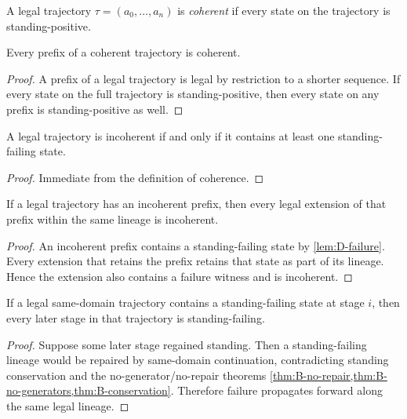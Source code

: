 \begin{definition}
A legal trajectory $\tau=(a_0,\dots,a_n)$ is \emph{coherent} if every state on the trajectory is standing-positive.
\end{definition}

\begin{lemma}
\label{thm:D-prefix}
Every prefix of a coherent trajectory is coherent.
\end{lemma}

\begin{proof}
A prefix of a legal trajectory is legal by restriction to a shorter sequence. If every state on the full trajectory is standing-positive, then every state on any prefix is standing-positive as well.
\end{proof}

\begin{lemma}
\label{lem:D-failure}
A legal trajectory is incoherent if and only if it contains at least one standing-failing state.
\end{lemma}

\begin{proof}
Immediate from the definition of coherence.
\end{proof}

\begin{theorem}
\label{thm:D-no-deferred}
If a legal trajectory has an incoherent prefix, then every legal extension of that prefix within the same lineage is incoherent.
\end{theorem}

\begin{proof}
An incoherent prefix contains a standing-failing state by \cref{lem:D-failure}. Every extension that retains the prefix retains that state as part of its lineage. Hence the extension also contains a failure witness and is incoherent.
\end{proof}

\begin{theorem}
\label{thm:D-irrecoverable}
If a legal same-domain trajectory contains a standing-failing state at stage $i$, then every later stage in that trajectory is standing-failing.
\end{theorem}

\begin{proof}
Suppose some later stage regained standing. Then a standing-failing lineage would be repaired by same-domain continuation, contradicting standing conservation and the no-generator/no-repair theorems \cref{thm:B-no-repair,thm:B-no-generators,thm:B-conservation}. Therefore failure propagates forward along the same legal lineage.
\end{proof}

